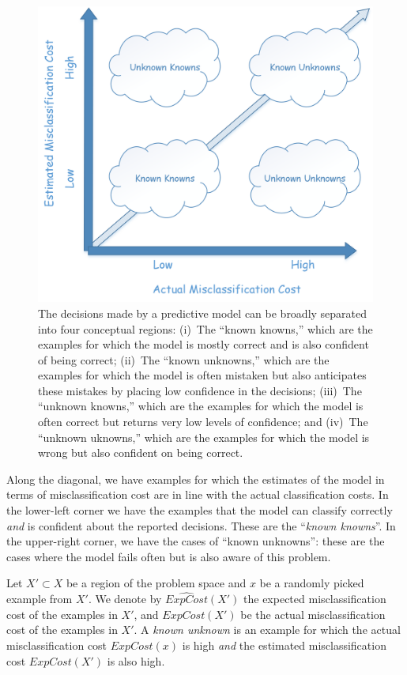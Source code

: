 \begin{figure}[t]
\centering
\includegraphics[width=0.5\columnwidth]{plots/Quadrant.png}
\caption{The decisions made by a predictive model can be broadly separated into four conceptual regions: (i)~The ``known knowns,'' which are the examples for which the model is mostly correct and is also confident of being correct; (ii)~The ``known unknowns,'' which are the examples for which the model is often mistaken but also anticipates these mistakes by placing low confidence in the decisions; (iii)~The ``unknown knowns,'' which are the examples for which the model is often correct but returns very low levels of confidence; and (iv)~The ``unknown uknowns,'' which are the examples for which the model is wrong but also confident on being correct.}
\label{fig:quadrant}
\end{figure}

Along the diagonal, we have examples for which the estimates of the model in terms of misclassification cost are in line with the actual classification costs. In the lower-left corner we have the examples that the model can classify correctly \emph{and} is confident about the reported decisions. These are the ``\emph{known knowns}''. In the upper-right corner, we have the cases of ``known unknowns'': these are the cases where the model fails often but is also aware of this problem.

\begin{definition}
\label{def:ku}
Let $X' \subset X$ be a region of the problem space and $x$ be a randomly picked example from $X'$. 
We denote by $\widehat{\mathit{ExpCost}}(X')$ the expected misclassification cost of the examples in $X'$, and $\mathit{ExpCost}(X')$ be the actual misclassification cost of the examples in $X'$. A \emph{known unknown} is an example for which the actual misclassification cost $\mathit{ExpCost}(x)$ is high \emph{and} the estimated misclassification cost $\mathit{ExpCost}(X')$ is also high.
\end{definition}

